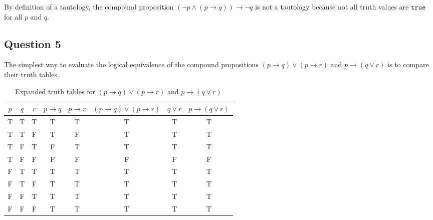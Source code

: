 \documentclass[letterpaper, 12pt]{article}
\begin{document}
By definition of a tautology, the compound proposition $(\neg p \land (p \to q)) \to \neg q$ is not a tautology because not all truth values are $\texttt{true}$ for all $p$ and $q$.

\subsection*{Question 5}

The simplest way to evaluate the logical equivalence of the compound propositions $(p \to q) \lor (p \to r)$ and $p \to (q \lor r)$ is to compare their truth tables.

\begin{comment}
Combine the 2 following tables and highlight the columns with the compound propositions
\end{comment}

\begin{table}[H]
\centering
    \begin{tabular}{|c c c|c|c|g|c|g|}
    \hline
    $p$ & $q$ & $r$ & $p \to q$ & $p \to r$ & $(p \to q) \lor (p \to r)$  & $q \lor r$ & $p \to (q \lor r)$\\ \hline
    T & T & T & T & T & T & T & T\\ \hline
    T & T & F & T & F & T & T & T\\ \hline
    T & F & T & F & T & T & T & T\\ \hline
    T & F & F & F & F & F & F & F\\ \hline
    F & T & T & T & T & T & T & T\\ \hline
    F & T & F & T & T & T & T & T\\ \hline
    F & F & T & T & T & T & T & T\\ \hline
    F & F & F & T & T & T & T & T\\ \hline
    \end{tabular}
    \caption{Expanded truth tables for $(p \to q) \lor (p \to r)$ and $p \to (q \lor r)$}
    \label{table:3}
\end{table}

\begin{comment}
\begin{table}[H]
\centering
    \begin{tabular}{|c|c|c|c|c|}
    \hline
    $p$ & $q$ & $r$ & $q \lor r$ & $p \to (q \lor r)$\\ \hline
    T & T & T & T & T\\ \hline
    T & T & F & T & T\\ \hline
    T & F & T & T & T\\ \hline
    T & F & F & F & F\\ \hline
    F & T & T & T & T\\ \hline
    F & T & F & T & T\\ \hline
    F & F & T & T & T\\ \hline
    F & F & F & T & T\\ \hline
    \end{tabular}
    \caption{Expanded truth table for $p \to (q \lor (p \to r)$}
    \label{table:4}
\end{table}
\end{comment}
\end{document}
